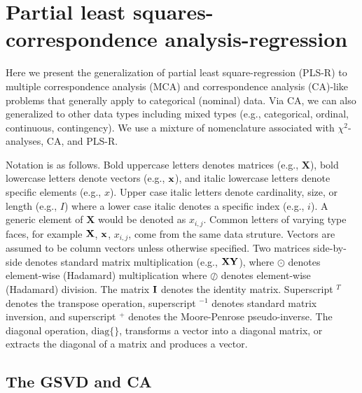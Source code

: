 \documentclass[12pt]{article}
\begin{document}
\hypertarget{partial-least-squares-correspondence-analysis-regression}{%
\section{Partial least squares-correspondence
analysis-regression}\label{partial-least-squares-correspondence-analysis-regression}}

\label{section:PLSCAR}

Here we present the generalization of partial least square-regression
(PLS-R) to multiple correspondence analysis (MCA) and correspondence
analysis (CA)-like problems that generally apply to categorical
(nominal) data. Via CA, we can also generalized to other data types
including mixed types (e.g., categorical, ordinal, continuous,
contingency). We use a mixture of nomenclature associated with
\(\chi^2\)-analyses, CA, and PLS-R.

Notation is as follows. Bold uppercase letters denotes matrices (e.g.,
\(\mathbf{X}\)), bold lowercase letters denote vectors (e.g.,
\(\bf{x}\)), and italic lowercase letters denote specific elements
(e.g., \(x\)). Upper case italic letters denote cardinality, size, or
length (e.g., \(I\)) where a lower case italic denotes a specific index
(e.g., \(i\)). A generic element of \(\mathbf{X}\) would be denoted as
\(x_{i,j}\). Common letters of varying type faces, for example
\({\bf X}\), \(\bf{x}\), \(x_{i,j}\), come from the same data struture.
Vectors are assumed to be column vectors unless otherwise specified. Two
matrices side-by-side denotes standard matrix multiplication (e.g.,
\(\bf{X}\bf{Y}\)), where \(\odot\) denotes element-wise (Hadamard)
multiplication where \(\oslash\) denotes element-wise (Hadamard)
division. The matrix \({\bf I}\) denotes the identity matrix.
Superscript \(^{T}\) denotes the transpose operation, superscript
\(^{-1}\) denotes standard matrix inversion, and superscript \(^{+}\)
denotes the Moore-Penrose pseudo-inverse. The diagonal operation,
\(\mathrm{diag\{\}}\), transforms a vector into a diagonal matrix, or
extracts the diagonal of a matrix and produces a vector.

\hypertarget{the-gsvd-and-ca}{%
\subsection{The GSVD and CA}\label{the-gsvd-and-ca}}

\label{section:GSVDCA}
\end{document}
